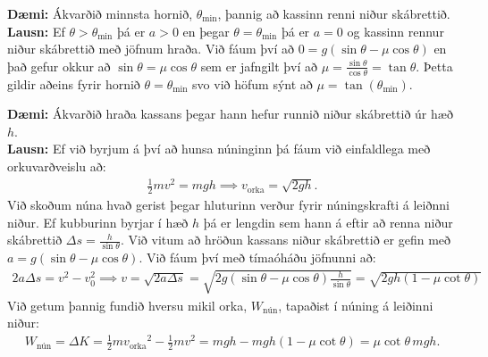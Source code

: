 \ifdefined \wholebook \else\documentclass[oneside]{book}\usepackage{EdlBook}\graphicspath{{figures/}}
\begin{document}
\textbf{Dæmi:} Ákvarðið minnsta hornið, $\theta_{\text{min}}$, þannig að kassinn renni niður skábrettið. \\

\textbf{Lausn:} Ef $\theta > \theta_{\text{min}}$ þá er $a > 0$ en þegar $\theta = \theta_{\text{min}}$ þá er $a = 0$ og kassinn rennur niður skábrettið með jöfnum hraða. Við fáum því að $0 = g(\sin\theta - \mu \cos\theta)$ en það gefur okkur að $\sin\theta = \mu \cos\theta$ sem er jafngilt því að $\mu = \frac{\sin\theta}{\cos\theta} = \tan\theta$. Þetta gildir aðeins fyrir hornið $\theta = \theta_{\text{min}}$ svo við höfum sýnt að $\mu = \tan(\theta_{\text{min}})$.

\textbf{Dæmi:} Ákvarðið hraða kassans þegar hann hefur runnið niður skábrettið úr hæð $h$. \\

\textbf{Lausn:} Ef við byrjum á því að hunsa núninginn þá fáum við einfaldlega með orkuvarðveislu að:
\begin{align*}
    \frac{1}{2}mv^2 = mgh \implies v_{\text{orka}} = \sqrt{2gh}.
\end{align*}
Við skoðum núna hvað gerist þegar hluturinn verður fyrir núningskrafti á leiðnni niður. Ef kubburinn byrjar í hæð $h$ þá er lengdin sem hann á eftir að renna niður skábrettið $\Delta s = \frac{h}{\sin\theta}$. Við vitum að hröðun kassans niður skábrettið er gefin með $a = g(\sin\theta - \mu \cos\theta)$. Við fáum því með tímaóháðu jöfnunni að:
\begin{align*}
    2a \Delta s = v^2 - v_0^2 \implies v = \sqrt{2a\Delta s} = \sqrt{2g(\sin\theta - \mu \cos\theta)\frac{h}{\sin\theta}} = \sqrt{2gh\left(1-\mu\cot\theta \right)}
\end{align*}
Við getum þannig fundið hversu mikil orka, $W_{\text{nún}}$, tapaðist í núning á leiðinni niður:
\begin{align*}
    W_{\text{nún}} = \Delta K = \frac{1}{2}m {v_{\text{orka}}}^2 - \frac{1}{2}mv^2 = mgh - mgh(1-\mu \cot\theta) = \mu \cot\theta \, mgh.
\end{align*}
\end{document}
